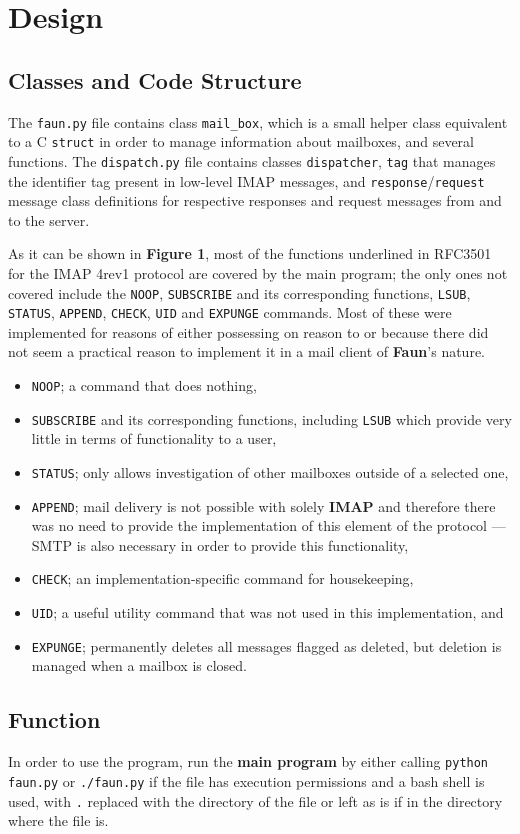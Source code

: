 \documentclass{article}
\newcommand{\enterSectionHeader}[1]{
\nobreak\extramarks{}{}\nobreak
\nobreak\extramarks{}{}\nobreak
}
\newcounter{docSectionCounter} %
\newcommand{\docSectionName}{}
\newenvironment{docSection}[1][Section \arabic{docSectionCounter}]{ %
\stepcounter{docSectionCounter} %
\renewcommand{\docSectionName}{#1} %
\section{\docSectionName} %
\enterSectionHeader{\docSectionName} %
}{
}
\newcommand{\docSubsectionName}{}
\newenvironment{docSubsection}[1]{ %
\renewcommand{\docSubsectionName}{#1} %
\subsection{\docSubsectionName} %
\enterSectionHeader{\docSubsectionName} %
}{
\enterSectionHeader{\docSectionName} %
}
\begin{document}
\begin{docSection}[Design]
\begin{docSubsection}{Classes and Code Structure}
The \texttt{faun.py} file contains class \texttt{mail\_box}, which is a small helper class equivalent to a C \texttt{struct} in order to manage information about mailboxes, and several functions. The \texttt{dispatch.py} file contains classes \texttt{dispatcher}, \texttt{tag} that manages the identifier tag present in low-level IMAP messages, and \texttt{response}/\texttt{request} message class definitions for respective responses and request messages from and to the server.

As it can be shown in \textbf{Figure 1}, most of the functions underlined in RFC3501 for the IMAP 4rev1 protocol are covered by the main program; the only ones not covered include the \texttt{NOOP}, \texttt{SUBSCRIBE} and its corresponding functions, \texttt{LSUB}, \texttt{STATUS}, \texttt{APPEND}, \texttt{CHECK}, \texttt{UID} and \texttt{EXPUNGE} commands. Most of these were implemented for reasons of either possessing on reason to or because there did not seem a practical reason to implement it in a mail client of \textbf{Faun}'s nature.

\begin{itemize}
    \item \texttt{NOOP}; a command that does nothing, 
    \item \texttt{SUBSCRIBE} and its corresponding functions, including \texttt{LSUB} which provide very little in terms of functionality to a user, 
    \item \texttt{STATUS}; only allows investigation of other mailboxes outside of a selected one, 
    \item \texttt{APPEND}; mail delivery is not possible with solely \textbf{IMAP} and therefore there was no need to provide the implementation of this element of the protocol --- SMTP is also necessary in order to provide this functionality, 
    \item \texttt{CHECK}; an implementation-specific command for housekeeping,
    \item \texttt{UID}; a useful utility command that was not used in this implementation, and 
    \item \texttt{EXPUNGE}; permanently deletes all messages flagged as deleted, but deletion is managed when a mailbox is closed.
\end{itemize}

\end{docSubsection}
\begin{docSubsection}{Function}
In order to use the program, run the \textbf{main program} by either calling \texttt{python faun.py} or \texttt{./faun.py} if the file has execution permissions and a bash shell is used, with \texttt{.} replaced with the directory of the file or left as is if in the directory where the file is. 


\end{docSubsection}
\end{docSection}
\end{document}
